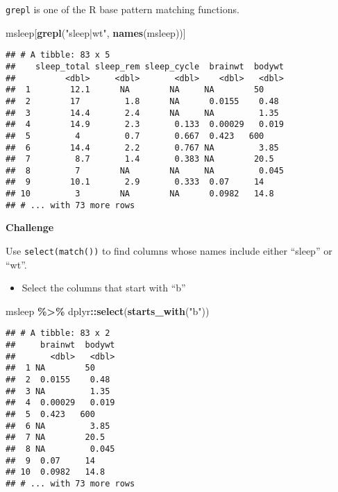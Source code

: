 \documentclass[
]{book}
\newenvironment{Shaded}{\begin{snugshade}}{\end{snugshade}}
\newcommand{\KeywordTok}[1]{\textcolor[rgb]{0.13,0.29,0.53}{\textbf{#1}}}
\newcommand{\NormalTok}[1]{#1}
\newcommand{\OperatorTok}[1]{\textcolor[rgb]{0.81,0.36,0.00}{\textbf{#1}}}
\newcommand{\StringTok}[1]{\textcolor[rgb]{0.31,0.60,0.02}{#1}}
\providecommand{\tightlist}{%
  \setlength{\itemsep}{0pt}\setlength{\parskip}{0pt}}
\begin{document}
\texttt{grepl} is one of the R base pattern matching functions.

\begin{Shaded}
\begin{Highlighting}[]
\NormalTok{msleep[}\KeywordTok{grepl}\NormalTok{(}\StringTok{"sleep|wt"}\NormalTok{, }\KeywordTok{names}\NormalTok{(msleep))]}
\end{Highlighting}
\end{Shaded}

\begin{verbatim}
## # A tibble: 83 x 5
##    sleep_total sleep_rem sleep_cycle  brainwt  bodywt
##          <dbl>     <dbl>       <dbl>    <dbl>   <dbl>
##  1        12.1      NA        NA     NA        50    
##  2        17         1.8      NA      0.0155    0.48 
##  3        14.4       2.4      NA     NA         1.35 
##  4        14.9       2.3       0.133  0.00029   0.019
##  5         4         0.7       0.667  0.423   600    
##  6        14.4       2.2       0.767 NA         3.85 
##  7         8.7       1.4       0.383 NA        20.5  
##  8         7        NA        NA     NA         0.045
##  9        10.1       2.9       0.333  0.07     14    
## 10         3        NA        NA      0.0982   14.8  
## # ... with 73 more rows
\end{verbatim}

\textbf{Challenge}

Use \texttt{select(match())} to find columns whose names include either ``sleep'' or ``wt''.

\begin{itemize}
\tightlist
\item
  Select the columns that start with ``b''
\end{itemize}

\begin{Shaded}
\begin{Highlighting}[]
\NormalTok{msleep }\OperatorTok{\%\textgreater{}\%}
\StringTok{  }\NormalTok{dplyr}\OperatorTok{::}\KeywordTok{select}\NormalTok{(}\KeywordTok{starts\_with}\NormalTok{(}\StringTok{"b"}\NormalTok{))}
\end{Highlighting}
\end{Shaded}

\begin{verbatim}
## # A tibble: 83 x 2
##     brainwt  bodywt
##       <dbl>   <dbl>
##  1 NA        50    
##  2  0.0155    0.48 
##  3 NA         1.35 
##  4  0.00029   0.019
##  5  0.423   600    
##  6 NA         3.85 
##  7 NA        20.5  
##  8 NA         0.045
##  9  0.07     14    
## 10  0.0982   14.8  
## # ... with 73 more rows
\end{verbatim}
\end{document}
